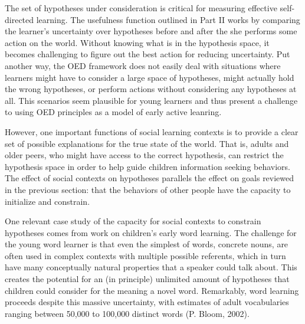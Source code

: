\documentclass[english,floatsintext,man]{apa6}
\theoremstyle{definition}
\theoremstyle{definition}
\theoremstyle{definition}
\theoremstyle{remark}
\begin{document}
The set of hypotheses under consideration is critical for measuring
effective self-directed learning. The usefulness function outlined in
Part II works by comparing the learner's uncertainty over hypotheses
before and after the she performs some action on the world. Without
knowing what is in the hypothesis space, it becomes challenging to
figure out the best action for reducing uncertainty. Put another way,
the OED framework does not easily deal with situations where learners
might have to consider a large space of hypotheses, might actually hold
the wrong hypotheses, or perform actions without considering any
hypotheses at all. This scenarios seem plausible for young learners and
thus present a challenge to using OED principles as a model of early
active leanring.

However, one important functions of social learning contexts is to
provide a clear set of possible explanations for the true state of the
world. That is, adults and older peers, who might have access to the
correct hypothesis, can restrict the hypothesis space in order to help
guide children information seeking behaviors. The effect of social
contexts on hypotheses parallels the effect on goals reviewed in the
previous section: that the behaviors of other people have the capacity
to initialize and constrain.

One relevant case study of the capacity for social contexts to constrain
hypotheses comes from work on children's early word learning. The
challenge for the young word learner is that even the simplest of words,
concrete nouns, are often used in complex contexts with multiple
possible referents, which in turn have many conceptually natural
properties that a speaker could talk about. This creates the potential
for an (in principle) unlimited amount of hypotheses that children could
consider for the meaning a novel word. Remarkably, word learning
proceeds despite this massive uncertainty, with estimates of adult
vocabularies ranging between 50,000 to 100,000 distinct words (P. Bloom,
2002).
\end{document}
